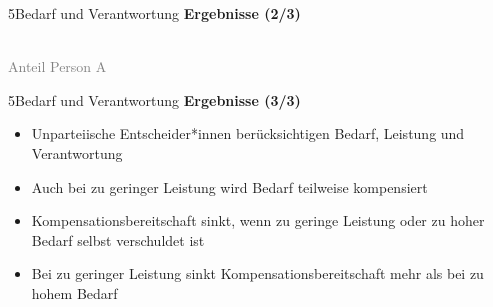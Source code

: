 \documentclass[xcolor=table,9pt,aspectratio=169]{beamer}
\begin{document}
\begin{frame}{\vspace*{10mm}5\hspace*{1em}Bedarf und Verantwortung}
\textbf{Ergebnisse (2/3)}\\
\medskip
\begin{center}
   \\
   \textcolor{gray}{Anteil Person A}
\end{center}
\end{frame}


\begin{frame}{\vspace*{10mm}5\hspace*{1em}Bedarf und Verantwortung}
\textbf{Ergebnisse (3/3)}\\
\medskip
\begin{itemize}
   \item Unparteiische Entscheider*innen berücksichtigen Bedarf, Leistung und Verantwortung
   \item Auch bei zu geringer Leistung wird Bedarf teilweise kompensiert
   \item Kompensationsbereitschaft sinkt, wenn zu geringe Leistung oder zu hoher Bedarf selbst verschuldet ist
   \item Bei zu geringer Leistung sinkt Kompensationsbereitschaft mehr als bei zu hohem Bedarf
\end{itemize}
\end{frame}
\end{document}
